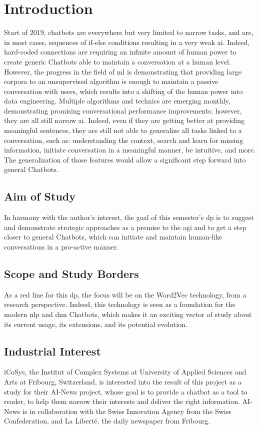 \chapter{Introduction}
\label{chap:introduction}

Start of 2019, chatbots are everywhere but very limited to narrow tasks, and are, in most cases, sequences of if-else conditions resulting in a very weak \gls{ai}. Indeed, hard-coded connections are requiring an infinite amount of human power to create generic Chatbots able to maintain a conversation at a human level. However, the progress in the field of \gls{ml} is demonstrating that providing large corpora to an unsupervised algorithm is enough to maintain a passive conversation with users, which results into a shifting of the human power into data engineering. Multiple algorithms and technics are emerging monthly, demonstrating promising conversational performance improvements; however, they are all still narrow \acrshort{ai}. Indeed, even if they are getting better at providing meaningful sentences, they are still not able to generalize all tasks linked to a conversation, such as: understanding the context, search and learn for missing information, initiate conversation in a meaningful manner, be intuitive, and more. The generalization of those features would allow a significant step forward into general Chatbots.

\section{Aim of Study}
In harmony with the author's interest, the goal of this semester's \gls{dp} is to suggest and demonstrate strategic approaches as a premise to the \acrshort{agi} and to get a step closer to general Chatbots, which can initiate and maintain human-like conversations in a pro-active manner.

\section{Scope and Study Borders}
As a red line for this \gls{dp}, the focus will be on the Word2Vec technology, from a research perspective. Indeed, this technology is seen as a foundation for the modern \acrshort{nlp} and \acrshort{dnn} Chatbots, which makes it an exciting vector of study about its current usage, its extensions, and its potential evolution. 

\section{Industrial Interest}
iCoSys, the Institut of Complex Systems at University of Applied Sciences and Arts at Fribourg, Switzerland, is interested into the result of this project as a study for their AI-News project, whose goal is to provide a chatbot as a tool to reader, to help them narrow their interests and deliver the right information. AI-News is in collaboration with the Swiss Innovation Agency from the Swiss Confederation, and La Liberté, the daily newspaper from Fribourg. 